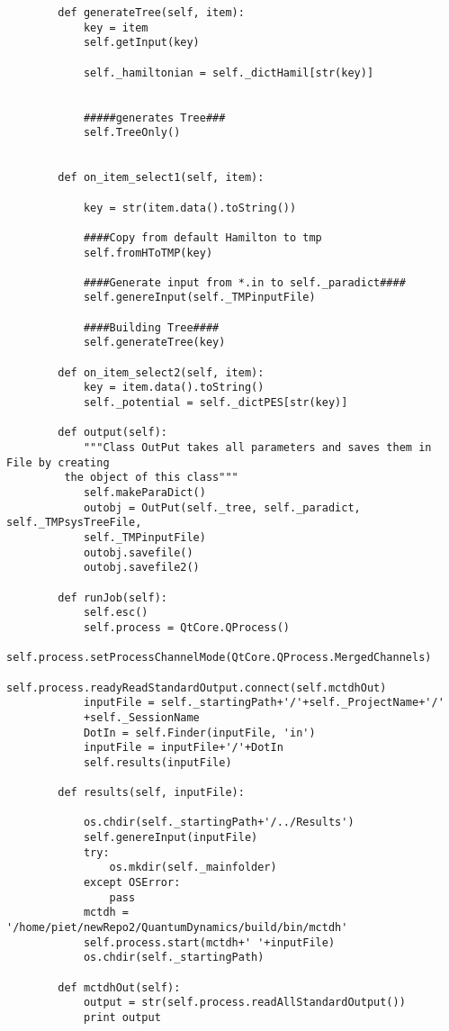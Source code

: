\begin{verbatim}
        def generateTree(self, item):
            key = item
            self.getInput(key)
            
            self._hamiltonian = self._dictHamil[str(key)]
    
    
            #####generates Tree###
            self.TreeOnly()
    
    
        def on_item_select1(self, item):
    
            key = str(item.data().toString())        
    
            ####Copy from default Hamilton to tmp
            self.fromHToTMP(key)
    
            ####Generate input from *.in to self._paradict####
            self.genereInput(self._TMPinputFile)
    
            ####Building Tree####
            self.generateTree(key)
    
        def on_item_select2(self, item):
            key = item.data().toString()
            self._potential = self._dictPES[str(key)]
    
        def output(self):
            """Class OutPut takes all parameters and saves them in File by creating
         the object of this class"""
            self.makeParaDict()
            outobj = OutPut(self._tree, self._paradict, self._TMPsysTreeFile, 
            self._TMPinputFile)
            outobj.savefile()
            outobj.savefile2()
    
        def runJob(self):
            self.esc()
            self.process = QtCore.QProcess()
            self.process.setProcessChannelMode(QtCore.QProcess.MergedChannels)
            self.process.readyReadStandardOutput.connect(self.mctdhOut)
            inputFile = self._startingPath+'/'+self._ProjectName+'/'
            +self._SessionName
            DotIn = self.Finder(inputFile, 'in')
            inputFile = inputFile+'/'+DotIn
            self.results(inputFile)
    
        def results(self, inputFile):
    
            os.chdir(self._startingPath+'/../Results')
            self.genereInput(inputFile)
            try:
                os.mkdir(self._mainfolder)
            except OSError:
                pass
            mctdh = '/home/piet/newRepo2/QuantumDynamics/build/bin/mctdh'
            self.process.start(mctdh+' '+inputFile)
            os.chdir(self._startingPath)
    
        def mctdhOut(self):
            output = str(self.process.readAllStandardOutput())
            print output
\end{verbatim}